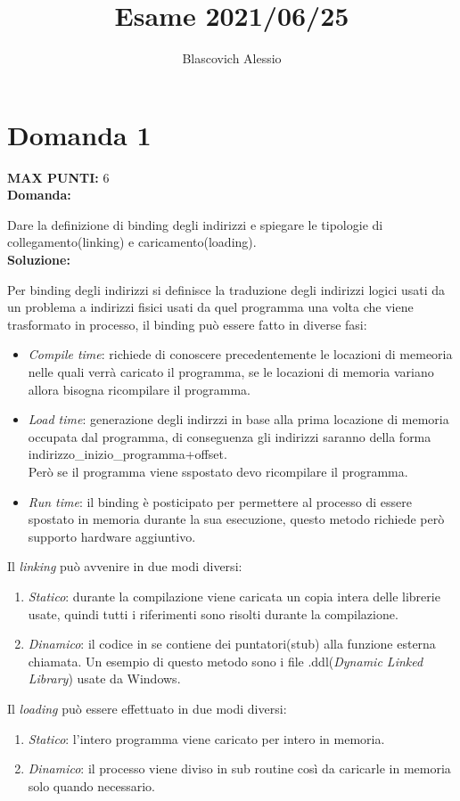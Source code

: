 \documentclass{article}
\title{Esame 2021/06/25}
\author{Blascovich Alessio}
\date{}
\begin{document}
   \maketitle
   \section*{Domanda 1}
   \textbf{MAX PUNTI:} 6\\
   \textbf{Domanda:}


   Dare la definizione di binding degli indirizzi e spiegare le tipologie di collegamento(linking) e caricamento(loading).\\
   \textbf{Soluzione:}


   Per binding degli indirizzi si definisce la traduzione degli indirizzi logici usati da un problema a indirizzi fisici usati da quel programma una volta che viene trasformato in processo, il binding può essere fatto in diverse fasi:
   \begin{itemize}
      \item \emph{Compile time}: richiede di conoscere precedentemente le locazioni di memeoria nelle quali verrà caricato il programma, se le locazioni di memoria variano allora bisogna ricompilare il programma.
      \item \emph{Load time}: generazione degli indirzzi in base alla prima locazione di memoria occupata dal programma, di conseguenza gli indirizzi saranno della forma indirizzo\_inizio\_programma+offset.\\
      Però se il programma viene sspostato devo ricompilare il programma.
      \item \emph{Run time}: il binding è posticipato per permettere al processo di essere spostato in memoria durante la sua esecuzione, questo metodo richiede però supporto hardware aggiuntivo.
   \end{itemize}
   Il \emph{linking} può avvenire in due modi diversi:
   \begin{enumerate}
      \item \emph{Statico}: durante la compilazione viene caricata un copia intera delle librerie usate, quindi tutti i riferimenti sono risolti durante la compilazione.
      \item \emph{Dinamico}: il codice in se contiene dei puntatori(stub) alla funzione esterna chiamata.
      Un esempio di questo metodo sono i file .ddl(\emph{Dynamic Linked Library}) usate da Windows.
   \end{enumerate}
   Il \emph{loading} può essere effettuato in due modi diversi:
   \begin{enumerate}
      \item \emph{Statico}: l'intero programma viene caricato per intero in memoria.
      \item \emph{Dinamico}: il processo viene diviso in sub routine così da caricarle in memoria solo quando necessario.
   \end{enumerate}
\end{document}
